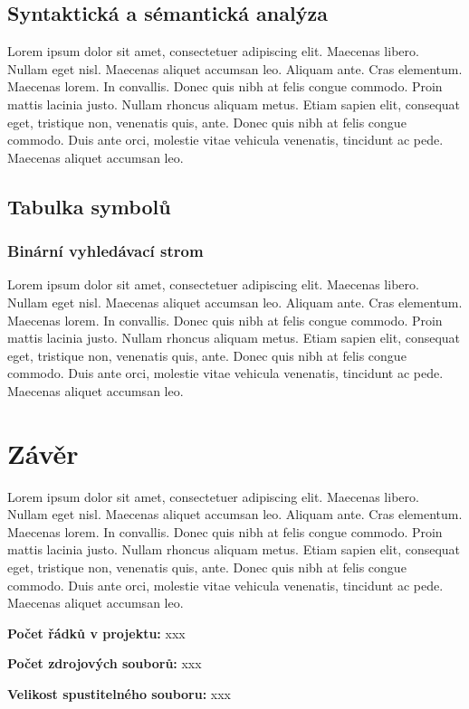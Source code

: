 \documentclass[11pt]{article}
\begin{document}
	\subsection{Syntaktická a sémantická analýza}	
	\begin{flushleft}
		Lorem ipsum dolor sit amet, consectetuer adipiscing elit. Maecenas libero. Nullam eget nisl. Maecenas aliquet accumsan leo. Aliquam ante. Cras elementum. Maecenas lorem. In convallis. Donec quis nibh at felis congue commodo. Proin mattis lacinia justo. Nullam rhoncus aliquam metus. Etiam sapien elit, consequat eget, tristique non, venenatis quis, ante. Donec quis nibh at felis congue commodo. Duis ante orci, molestie vitae vehicula venenatis, tincidunt ac pede. Maecenas aliquet accumsan leo.\par	
	\end{flushleft}
	
	\subsection{Tabulka symbolů}
	\subsubsection{Binární vyhledávací strom}	
	\begin{flushleft}
		Lorem ipsum dolor sit amet, consectetuer adipiscing elit. Maecenas libero. Nullam eget nisl. Maecenas aliquet accumsan leo. Aliquam ante. Cras elementum. Maecenas lorem. In convallis. Donec quis nibh at felis congue commodo. Proin mattis lacinia justo. Nullam rhoncus aliquam metus. Etiam sapien elit, consequat eget, tristique non, venenatis quis, ante. Donec quis nibh at felis congue commodo. Duis ante orci, molestie vitae vehicula venenatis, tincidunt ac pede. Maecenas aliquet accumsan leo.\par	
	\end{flushleft}
	
	\section{Závěr}
	\begin{flushleft}
		Lorem ipsum dolor sit amet, consectetuer adipiscing elit. Maecenas libero. Nullam eget nisl. Maecenas aliquet accumsan leo. Aliquam ante. Cras elementum. Maecenas lorem. In convallis. Donec quis nibh at felis congue commodo. Proin mattis lacinia justo. Nullam rhoncus aliquam metus. Etiam sapien elit, consequat eget, tristique non, venenatis quis, ante. Donec quis nibh at felis congue commodo. Duis ante orci, molestie vitae vehicula venenatis, tincidunt ac pede. Maecenas aliquet accumsan leo.\par
		
		\item \textbf{Počet řádků v projektu:} xxx
		\item \textbf{Počet zdrojových souborů:} xxx
		\item \textbf{Velikost spustitelného souboru:} xxx		
	\end{flushleft}
	
\end{document}

